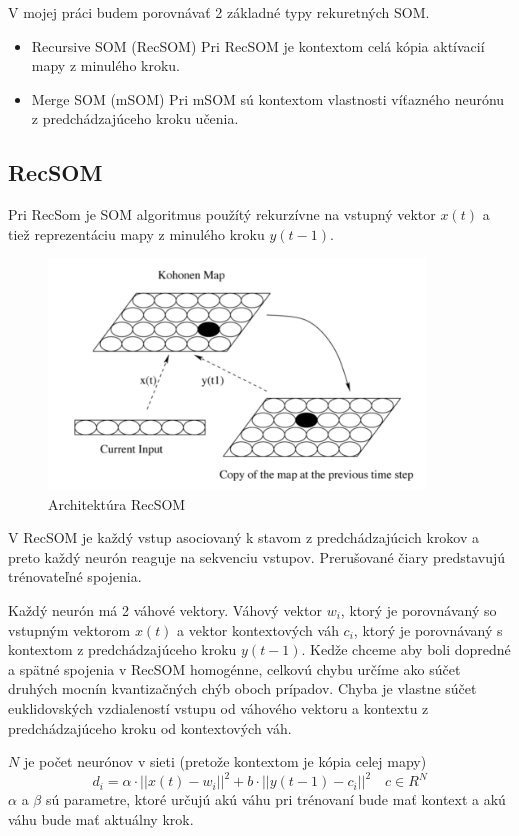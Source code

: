 V mojej práci budem porovnávať 2 základné typy rekuretných SOM.

\begin{itemize}
	\item Recursive SOM (RecSOM)
	Pri RecSOM je kontextom celá kópia aktívacií mapy z minulého kroku.
	\item Merge SOM (mSOM)
	Pri mSOM sú kontextom vlastnosti víťazného neurónu z predchádzajúceho kroku učenia.
\end{itemize}

\subsection{RecSOM}
Pri RecSom je SOM algoritmus použítý rekurzívne na vstupný vektor $x(t)$ a tiež reprezentáciu mapy
z minulého kroku $y(t-1)$. 

\begin{figure}[H]
	\centering
	\includegraphics[width=10cm]{assets/rec_som}
	\caption{Architektúra RecSOM}
\end{figure}

V RecSOM je každý vstup asociovaný k stavom z predchádzajúcich krokov a preto každý 
neurón reaguje na sekvenciu vstupov.
Prerušované čiary predstavujú trénovateľné spojenia.

Každý neurón má 2 váhové vektory. Váhový vektor $w_i$, ktorý je porovnávaný so
vstupným vektorom $x(t)$ a vektor kontextových váh $c_i$, ktorý je porovnávaný s kontextom z predchádzajúceho
kroku $y(t-1)$. Kedže chceme aby boli dopredné a spätné spojenia v RecSOM homogénne, 
celkovú chybu určíme ako súčet druhých mocnín kvantizačných chýb oboch prípadov. Chyba je vlastne súčet euklidovských vzdialeností
vstupu od váhového vektoru a kontextu z predchádzajúceho kroku od kontextových váh. 

$N$ je počet neurónov v sieti (pretože kontextom je kópia celej mapy)
\begin{equation}
	d_i = \alpha \cdot ||x(t) - w_i||^{2} + b \cdot ||y(t-1) - c_i||^{2} \quad c \in R^{N}
\end{equation}
$\alpha$ a $\beta$ sú parametre, ktoré určujú akú váhu pri trénovaní bude mať kontext a akú váhu bude mať
aktuálny krok.

